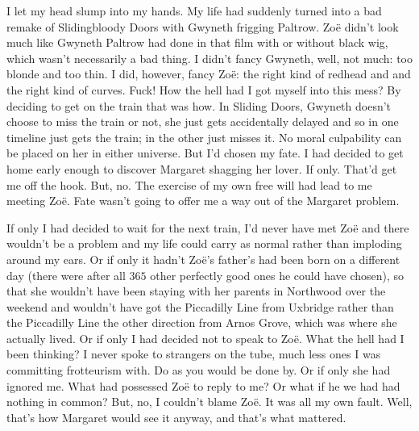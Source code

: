 I let my head slump into my hands. My life had suddenly turned into
a bad remake of {\twelvesl Sliding\/}bloody {\twelvesl Doors\/} with
Gwyneth frigging Paltrow. Zoë didn't look much like Gwyneth
Paltrow had done in that film with or without black wig, which
wasn't necessarily a bad thing. I didn't fancy Gwyneth, well, not
much: too blonde and too thin. I did, however, fancy Zoë: the
right kind of redhead and and the right kind of curves. Fuck! How
the hell had I got myself into this mess? By deciding to get on the
train that was how. In {\twelvesl Sliding Doors}, Gwyneth doesn't
choose to miss the train or not, she just gets accidentally delayed
and so in one timeline just gets the train; in the other just misses it.
No moral culpability can be placed on her in either universe. But
I'd chosen my fate. I had decided to get home early enough to
discover Margaret shagging her lover. If only. That'd get me off the
hook. But, no. The exercise of my own free will had lead to me
meeting Zoë. Fate wasn't going to offer me a way out of the
Margaret problem.

If only I had decided to wait for the next train, I'd never have met
Zoë and there wouldn't be a problem and my life could carry as
normal rather than imploding around my ears. Or if only it hadn't
Zoë's father's had been born on a different day (there were
after all $365$ other perfectly good ones he could have chosen), so
that she wouldn't have been staying with her parents in Northwood
over the weekend and wouldn't have got the Piccadilly Line
from Uxbridge rather than the Piccadilly Line the other direction from Arnos Grove, which was
where she actually lived. Or if only I had decided not to speak to
Zoë. What the hell had I been thinking? I never spoke to
strangers on the tube, much less ones I was committing frotteurism
with. Do as you would be done by. Or if only she had ignored me.
What had possessed Zoë to reply to me? Or what if he we had had
nothing in common? But, no, I couldn't blame Zoë. It was all my
own fault. Well, that's how Margaret would see it anyway, and that's
what mattered.

